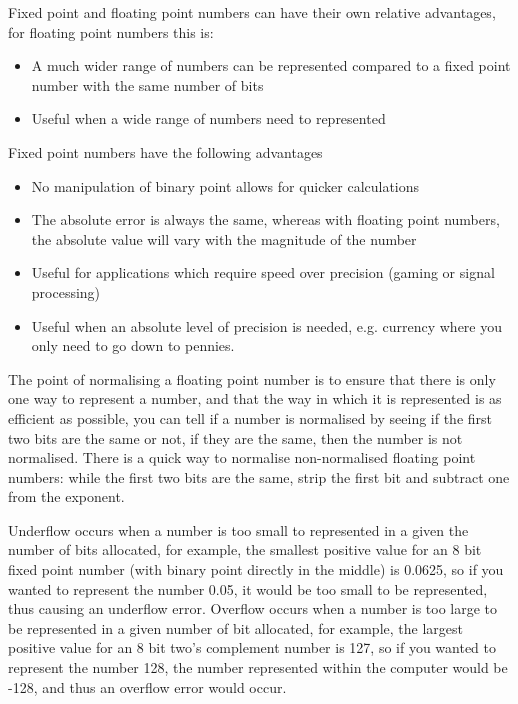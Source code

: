   \noindent
  Fixed point and floating point numbers can have their own relative advantages, for floating point numbers this is:
  \begin{itemize}
  	\item A much wider range of numbers can be represented compared to a fixed point number with the same number of bits
  	\item Useful when a wide range of numbers need to represented
  \end{itemize}
  Fixed point numbers have the following advantages
  \begin{itemize}
  	\item No manipulation of binary point allows for quicker calculations
  	\item The absolute error is always the same, whereas with floating point numbers, the absolute value will vary with the magnitude of the number
  	\item Useful for applications which require speed over precision (gaming or signal processing)
  	\item Useful when an absolute level of precision is needed, e.g. currency where you only need to go down to pennies.
  \end{itemize}
  
  \noindent
  The point of normalising a floating point number is to ensure that there is only one way to represent a number, and that the way in which it is represented is as efficient as possible, you can tell if a number is normalised by seeing if the first two bits are the same or not, if they are the same, then the number is not normalised. There is a quick way to normalise non-normalised floating point numbers: while the first two bits are the same, strip the first bit and subtract one from the exponent.
  
  \noindent
  Underflow occurs when a number is too small to represented in a given the number of bits allocated, for example, the smallest positive value for an 8 bit fixed point number (with binary point directly in the middle) is 0.0625, so if you wanted to represent the number 0.05, it would be too small to be represented, thus causing an underflow error. Overflow occurs when a number is too large to be represented in a given number of bit allocated, for example, the largest positive value for an 8 bit two's complement number is 127, so if you wanted to represent the number 128, the number represented within the computer would be -128, and thus an overflow error would occur.
  
